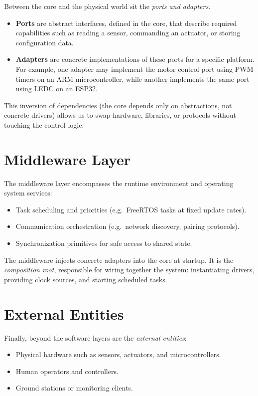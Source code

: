 Between the core and the physical world sit the \emph{ports and adapters}. 
\begin{itemize}
    \item \textbf{Ports} are abstract interfaces, defined in the core, that describe required capabilities such as reading a sensor, commanding an actuator, or storing configuration data.
    \item \textbf{Adapters} are concrete implementations of these ports for a specific platform. 
          For example, one adapter may implement the motor control port using PWM timers on an ARM microcontroller, while another implements the same port using LEDC on an ESP32. 
\end{itemize}

This inversion of dependencies (the core depends only on abstractions, not concrete drivers) allows us to swap hardware, libraries, or protocols without touching the control logic.

\section{Middleware Layer}

The middleware layer encompasses the runtime environment and operating system services:
\begin{itemize}
    \item Task scheduling and priorities (e.g.\ FreeRTOS tasks at fixed update rates).
    \item Communication orchestration (e.g.\ network discovery, pairing protocols).
    \item Synchronization primitives for safe access to shared state.
\end{itemize}

The middleware injects concrete adapters into the core at startup. 
It is the \emph{composition root}, responsible for wiring together the system: instantiating drivers, providing clock sources, and starting scheduled tasks.

\section{External Entities}

Finally, beyond the software layers are the \emph{external entities}:
\begin{itemize}
    \item Physical hardware such as sensors, actuators, and microcontrollers.
    \item Human operators and controllers.
    \item Ground stations or monitoring clients.
\end{itemize}


